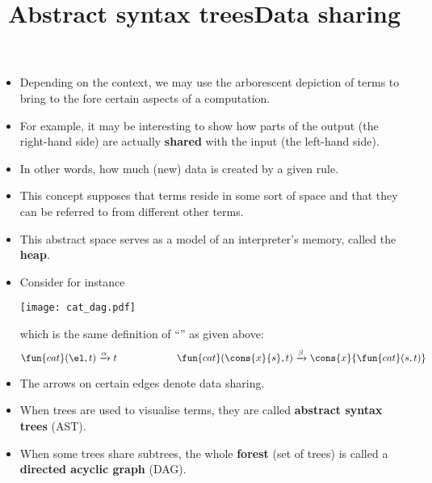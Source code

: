 \documentclass[wide]{slides}
\begin{document}
\begin{slide}
  \title{Abstract syntax trees}

  \begin{itemize}

    \item Depending on the context, we may use the arborescent
      depiction of terms to bring to the fore certain aspects of a
      computation.

    \item For example, it may be interesting to show how parts of the
      output (the right\hyp{}hand side) are actually \textbf{shared}
      with the input (the left\hyp{}hand side).

    \item In other words, how much (new) data is created by a given
      rule.

    \item This concept supposes that terms reside in some sort of
      space and that they can be referred to from different other
      terms.

    \item This abstract space serves as a model of an interpreter's
      memory, called the \textbf{heap}.

  \end{itemize}

\end{slide}

\begin{slide}
  \title{Data sharing}

  \begin{itemize}

    \item Consider for instance
      \begin{center}
        \centering
        \texttt{[image: cat\_dag.pdf]}
        \bigskip
      \end{center}
      which is the same definition of ``'' as given above:
      \bigskip
      \begin{equation*}
        \fun{cat}(\el,t) \xrightarrow{\alpha} t
        \qquad\qquad\qquad
        \fun{cat}(\cons{x}{s},t) \xrightarrow{\beta}
        \cons{x}{\fun{cat}(s,t)}
      \end{equation*}
      \smallskip

    \item The arrows on certain edges denote data sharing.

    \item When trees are used to visualise terms, they are called
      \textbf{abstract syntax trees} (AST).

    \item When some trees share subtrees, the whole \textbf{forest}
      (set of trees) is called a \textbf{directed acyclic graph}
      (DAG).

  \end{itemize}

\end{slide}
\end{document}

